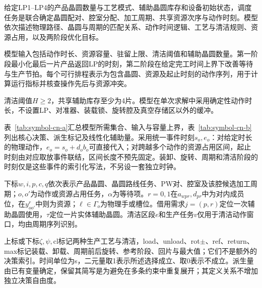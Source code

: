 \documentclass[final,5p,times,twocolumn]{elsarticle}
\begin{document}
给定LP1--LP4的产品晶圆数量与工艺模式、辅助晶圆库存和设备初始状态，调度任务是联合确定晶圆配对、腔室分配、加工周期、共享资源次序与动作时刻。模型依次描述物理路径、晶圆与周期的匹配关系、动作时间逻辑、工艺与清洁规则、资源占用，以及两阶段优化目标。

模型输入包括动作时长、资源容量、驻留上限、清洁阈值和辅助晶圆数量。第一阶段最小化最后一片产品返回LP的时刻，第二阶段在给定完工时间上界下改善等待与生产节拍。每个可行排程表示为包含晶圆、资源及起止时刻的动作序列，用于计算运行指标并核查操作先后与资源冲突。

清洁阈值$H\ge2$，共享辅助库存至少为4片。模型在单次求解中采用确定性动作时长，不设置LP、对准器、装载锁、旋转腔及真空存储区以外的缓冲。

表~\ref{tab:symbol-cn-a}汇总模型所需集合、输入与容量上界，表~\ref{tab:symbol-cn-b}列出核心决策、派生标记及线性化辅助量。采用统一事件时刻$s_o,e_o$：对给定时长的物理动作，$e_o=s_o+d_ob_o$可直接代入；对跨越多个动作的资源占用区间，起止时刻由对应取放事件联结，区间长度不预先固定。装卸、旋转、周期和清洁阶段的时刻仅是这些事件的索引化写法，不另设一套独立时钟。

下标$w,i,p,c,q$依次表示产品晶圆、晶圆路线任务、PW对、腔室及该腔候选加工周期；$o,o'$为动作或资源占用任务，$\alpha$为等待项。$r=0,1$在$a_{wpr},d_{pr}$中为对内成员位，在$y^r_{oo'}$中则为资源；$\ell\in\Gamma_o$为物理手或槽位。借用需求$j=(p,r)$定位一次辅助晶圆使用，$\tau$定位一片实体辅助晶圆。清洁区段$e$和生产任务$v$仅用于清洁动作窗口，均由周期序列识别。

上标或下标$\zeta,\psi,\mathrm{cl}$标记两种生产工艺与清洁，load、unload、rot$\pm$、ref、return、max标记装载、卸载、周期前后旋转、参考阶段、回片与最大值；它们不是额外的决策索引。时间单位为s，二元量取1表示所述选择成立、取0表示不成立。派生量由已有变量确定，保留其简写是为避免在多条约束中重复展开；其定义关系不增加独立决策自由度。
\end{document}
